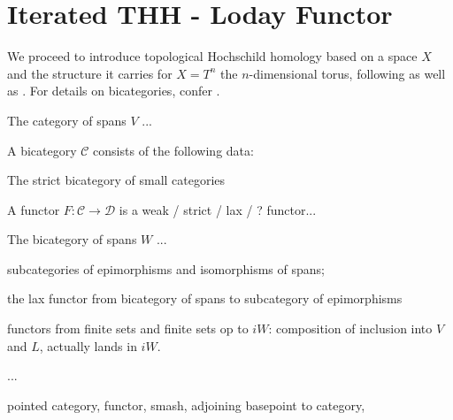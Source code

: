 \section{Iterated THH - Loday Functor}
  We proceed to introduce topological Hochschild homology based on a space $X$ and the structure it carries for $X = T^n$ the $n$-dimensional torus, following \cite{brun2010covering} as well as \cite{carlsson2011higher}. For details on bicategories, confer \cite{benabou1967introduction}.\\
  \begin{defn}\label{def_cateogry_of_spans}
    The category of spans $V$ ...
  \end{defn}
  \begin{defn}\label{def_bicategory}
    A bicategory $\mathcal{C}$ consists of the following data:
  \end{defn}
  \begin{ex}\label{ex_bicategory_of_categories}
    The strict bicategory of small categories
  \end{ex}
  \begin{defn}\label{def_bicategory_functor}
    A functor $F: \mathcal{C} \to \mathcal{D}$ is a weak / strict / lax / ? functor...
  \end{defn}
  \begin{defn}\label{def_bicategory_of_spans}
    The bicategory of spans $W$ ...
  \end{defn}
  \begin{defn}\label{def_subcategories_of_epimorphisms_and_isomorphisms}
    subcategories of epimorphisms and isomorphisms of spans;
  \end{defn}
  \begin{defn}\label{def_lax_functor_V_to_eW}
    the lax functor from bicategory of spans to subcategory of epimorphisms
  \end{defn}
  \begin{defn}\label{def_functors_finite_sets_to_iW}
    functors from finite sets and finite sets op to $iW$: composition of inclusion into $V$ and $L$, actually lands in $iW$.
  \end{defn}
  \begin{defn}\label{def_functor_iW_to_Cat}
    ...
  \end{defn}
  \begin{defn}\label{def_pointed_stuff}
    pointed category, functor, smash, adjoining basepoint to category,
  \end{defn}

